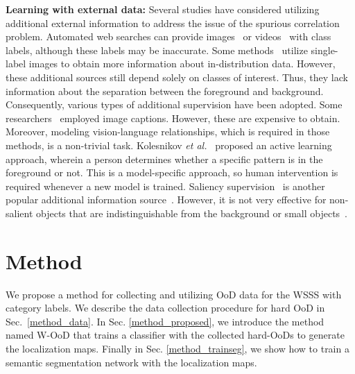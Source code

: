 \documentclass[10pt,twocolumn,letterpaper]{article}
\begin{document}
\vspace{0.2em}
\textbf{Learning with external data:}
Several studies have considered utilizing additional external information to address the issue of the spurious correlation problem.
Automated web searches can provide images~\cite{shen2018bootstrapping, jin2017webly} or
videos~\cite{hong2017weakly, lee2019frame} with class labels, although these labels may be inaccurate.
Some methods~\cite{li2019attention, sun2020mining} utilize single-label images to obtain more information about in-distribution data.
However, these additional sources still depend solely on classes of interest. Thus, they lack information about the separation between the foreground and background.
Consequently, various types of additional supervision have been adopted.
Some researchers~\cite{vilar2021extracting, sawatzky2019harvesting} employed image captions.
However, these are expensive to obtain. Moreover, modeling vision-language relationships, which is required in those methods, is a non-trivial task.
Kolesnikov \textit{et al.}~\cite{kolesnikov2016improving} proposed an active learning approach, wherein a person determines whether a specific pattern is in the foreground or not.
This is a model-specific approach, so human intervention is required whenever a new model is trained.
Saliency supervision~\cite{wang2017learning, cheng2014global} is another popular additional information source~\cite{lee2021reducing, lee2019frame, sun2020mining, wu2021embedded, yao2021nonsalient, lee2021railroad, joon2017exploiting}. 
However, it is not very effective for non-salient objects that are indistinguishable from the background or small objects~\cite{lee2021reducing, wu2021embedded, lee2021railroad}.








\section{Method}

We propose a method for collecting and utilizing OoD data for the WSSS with category labels. 
We describe the data collection procedure for hard OoD in Sec.~\ref{method_data}. In Sec. \ref{method_proposed}, we introduce the method named W-OoD that trains a classifier with the collected hard-OoDs to generate the localization maps. 
Finally in Sec. \ref{method_trainseg}, we show how to train a semantic segmentation network with the localization maps. 
\end{document}
